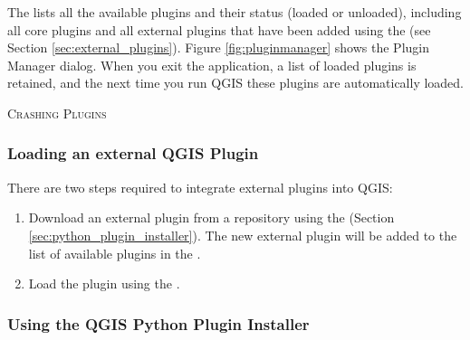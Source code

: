 The  lists all the available plugins and their status (loaded or unloaded), 
including all core plugins and all external plugins that have been added using the  
(see Section \ref{sec:external_plugins}). 
Figure \ref{fig:pluginmanager} shows the Plugin Manager dialog.
When you exit the application, a list of loaded plugins is retained, and the next time 
you run QGIS these plugins are automatically loaded.

\begin{Tip}\caption{\textsc{Crashing Plugins}}
\end{Tip} 

\subsubsection{Loading an external QGIS Plugin}\label{sec:load_external_plugin} 

There are two steps required to integrate external plugins into QGIS: 

\begin{enumerate}
\item Download an external plugin from a repository using the  (Section \ref{sec:python_plugin_installer}).
The new external plugin will be added to the list of available plugins in the .
\item Load the plugin using the .
\end{enumerate}

\subsubsection{Using the QGIS Python Plugin Installer}\label{sec:python_plugin_installer}

